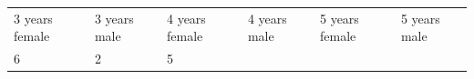 \begin{enumerate}[noitemsep, label=\textbf{\arabic*}. ]
{\begin{tabular}[t]{|l|l|l|l|l|l|}
    
        3 years
female &
    
    
        3 years male &
    
    
        4 years female &
    
    
        4
years male &
    
    
        5 years female &
    
    
        5 years male%
     \tabularnewline\cline{1-1}\cline{2-2}\cline{3-3}\cline{4-4}\cline{5-5}\cline{6-6}
    
    
        6 &
    
    
        2 &
    
    
        5 &
    

\end{tabular}}
\end{enumerate}
